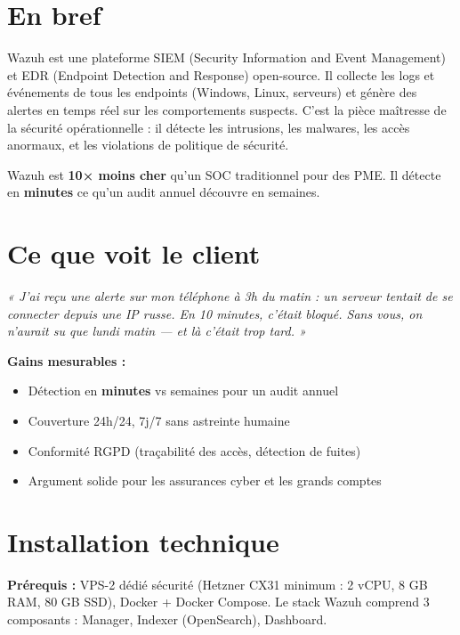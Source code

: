 \documentclass[11pt, a4paper]{article}
\begin{document}
\ficheHeader

\section*{En bref}
Wazuh est une plateforme SIEM (Security Information and Event Management) et EDR (Endpoint Detection and Response) open-source. Il collecte les logs et événements de tous les endpoints (Windows, Linux, serveurs) et génère des alertes en temps réel sur les comportements suspects. C'est la pièce maîtresse de la sécurité opérationnelle : il détecte les intrusions, les malwares, les accès anormaux, et les violations de politique de sécurité.

\begin{pointcle}
  Wazuh est \textbf{10× moins cher} qu'un SOC traditionnel pour des PME. Il détecte en \textbf{minutes} ce qu'un audit annuel découvre en semaines.
\end{pointcle}

\section{Ce que voit le client}

\begin{clientbox}
  \textit{« J'ai reçu une alerte sur mon téléphone à 3h du matin : un serveur tentait de se connecter depuis une IP russe. En 10 minutes, c'était bloqué. Sans vous, on n'aurait su que lundi matin — et là c'était trop tard. »}
\end{clientbox}

\textbf{Gains mesurables :}
\begin{itemize}
  \item Détection en \textbf{minutes} vs semaines pour un audit annuel
  \item Couverture 24h/24, 7j/7 sans astreinte humaine
  \item Conformité RGPD (traçabilité des accès, détection de fuites)
  \item Argument solide pour les assurances cyber et les grands comptes
\end{itemize}

\section{Installation technique}

\textbf{Prérequis :} VPS-2 dédié sécurité (Hetzner CX31 minimum : 2 vCPU, 8 GB RAM, 80 GB SSD), Docker + Docker Compose. Le stack Wazuh comprend 3 composants : Manager, Indexer (OpenSearch), Dashboard.
\end{document}
